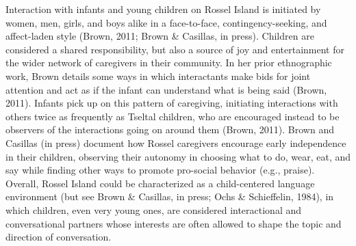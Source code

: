 \documentclass[,man,floatsintext]{apa6}
\begin{document}
Interaction with infants and young children on Rossel Island is
initiated by women, men, girls, and boys alike in a face-to-face,
contingency-seeking, and affect-laden style (Brown, 2011; Brown \&
Casillas, in press). Children are considered a shared responsibility,
but also a source of joy and entertainment for the wider network of
caregivers in their community. In her prior ethnographic work, Brown
details some ways in which interactants make bids for joint attention
and act as if the infant can understand what is being said (Brown,
2011). Infants pick up on this pattern of caregiving, initiating
interactions with others twice as frequently as Tseltal children, who
are encouraged instead to be observers of the interactions going on
around them (Brown, 2011). Brown and Casillas (in press) document how
Rossel caregivers encourage early independence in their children,
observing their autonomy in choosing what to do, wear, eat, and say
while finding other ways to promote pro-social behavior (e.g., praise).
Overall, Rossel Island could be characterized as a child-centered
language environment (but see Brown \& Casillas, in press; Ochs \&
Schieffelin, 1984), in which children, even very young ones, are
considered interactional and conversational partners whose interests are
often allowed to shape the topic and direction of conversation.
\end{document}
